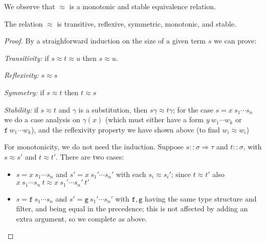 \documentclass[a4paper,USenglish,cleveref,autoref,thm-restate]{lipics-v2021}
\newcommand{\arrtype}{\Rightarrow}
\newcommand{\ismain}{\approx}
\newcommand{\eqpred}{\equiv}
\newcommand{\symb}[1]{\mathtt{#1}}
\newcommand{\afun}{\symb{f}}
\newcommand{\bfun}{\symb{g}}
\newcommand{\cfun}{\symb{h}}
\newcommand{\atype}{\sigma}
\newcommand{\btype}{\tau}
\newcommand{\filter}{\pi}
\begin{document}
We observe that $\ismain$ is a monotonic and stable equivalence relation.

\begin{lemma}\label{lem:ismain}
The relation $\ismain$ is transitive, reflexive, symmetric, monotonic, and stable.
\end{lemma}

\begin{proof}
By a straighforward induction on the size of a given term $s$ we can prove:

\emph{Transitivity:}
if $s \ismain t \ismain u$ then $s \ismain u$.

\emph{Reflexivity:} $s \ismain s$

\emph{Symmetry:} if $s \ismain t$ then $t \ismain s$

\emph{Stability:} if $s \ismain t$ and $\gamma$ is a substitution, then $s\gamma \ismain t\gamma$;
  for the case $s = x\ s_1 \cdots s_n$ we do a case analysis on $\gamma(x)$ (which must either have
  a form $y\ w_1 \cdots w_k$ or $\afun\ w_1 \cdots w_k$), and the reflexivity property we have
  shown above (to find $w_i \ismain w_i$)

For monotonicity, we do not need the induction.  Suppose $s :: \atype \arrtype \btype$ and $t ::
\atype$, with $s \ismain s'$ and $t \ismain t'$.  There are two cases:
\begin{itemize}
\item $s = x\ s_1 \cdots s_n$ and $s' = x\ s_1' \cdots s_n'$ with each $s_i \ismain s_i'$; since
  $t \ismain t'$ also $x\ s_1 \cdots s_n\ t \ismain x\ s_1' \cdots s_n'\ t'$
\item $s = \afun\ s_1 \cdots s_n$ and $s' = \bfun\ s_1' \cdots s_n'$ with $\afun,\bfun$ having the
  same type structure and filter, and being equal in the precedence; this is not affected by adding
  an extra argument, so we complete as above.
  \qedhere
\end{itemize}
\end{proof}
\end{document}
